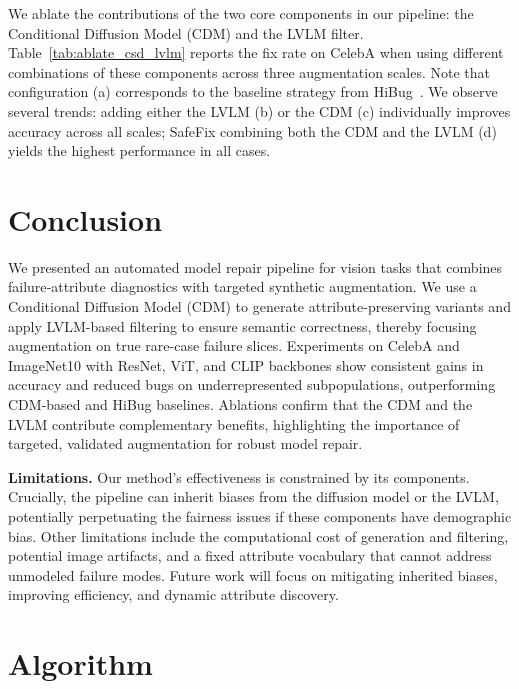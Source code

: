 \documentclass[10pt]{article} %
\newcommand{\model}{SafeFix\xspace}
\newcommand{\hibug}{HiBug\xspace}
\begin{document}
We ablate the contributions of the two core components in our pipeline: the Conditional Diffusion Model (CDM) and the LVLM filter. Table~\ref{tab:ablate_csd_lvlm} reports the fix rate on CelebA when using different combinations of these components across three augmentation scales. Note that configuration (a) corresponds to the baseline strategy from \hibug~\citep{chen2023hibug}. We observe several trends: adding either the LVLM (b) or the CDM (c) individually improves accuracy across all scales; \model combining both the CDM and the LVLM (d) yields the highest performance in all cases.

\section{Conclusion}

We presented an automated model repair pipeline for vision tasks that combines failure‐attribute diagnostics with targeted synthetic augmentation. We use a Conditional Diffusion Model (CDM) to generate attribute-preserving variants and apply LVLM-based filtering to ensure semantic correctness, thereby focusing augmentation on true rare-case failure slices. Experiments on CelebA and ImageNet10 with ResNet, ViT, and CLIP backbones show consistent gains in accuracy and reduced bugs on underrepresented subpopulations, outperforming CDM-based and \hibug{} baselines. Ablations confirm that the CDM and the LVLM contribute complementary benefits, highlighting the importance of targeted, validated augmentation for robust model repair.

\noindent\textbf{Limitations.}
Our method’s effectiveness is constrained by its components. Crucially, the pipeline can inherit biases from the diffusion model or the LVLM, potentially perpetuating the fairness issues if these components have demographic bias. Other limitations include the computational cost of generation and filtering, potential image artifacts, and a fixed attribute vocabulary that cannot address unmodeled failure modes. Future work will focus on mitigating inherited biases, improving efficiency, and dynamic attribute discovery.







\clearpage


\appendix


\section{Algorithm}
\end{document}
